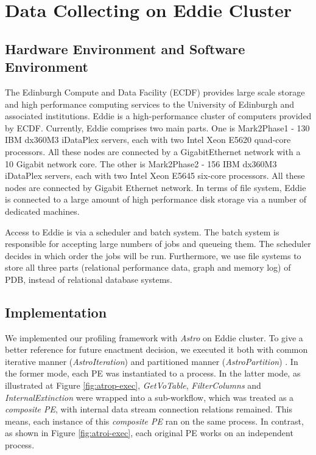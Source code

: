 \documentclass[10pt,twoside,openright,logo]{report}
\begin{document}
\section{Data Collecting on Eddie Cluster}
\subsection{Hardware Environment and Software Environment}
The Edinburgh Compute and Data Facility (ECDF) provides large scale storage and high performance computing services to the University of Edinburgh and associated institutions. Eddie is a high-performance cluster of computers provided by ECDF. Currently, Eddie comprises two main parts. One is Mark2Phase1 - 130 IBM dx360M3 iDataPlex servers, each with two Intel Xeon E5620 quad-core processors. All these nodes are connected by a GigabitEthernet network with a 10 Gigabit network core. The other is Mark2Phase2 - 156 IBM dx360M3 iDataPlex servers, each with two Intel Xeon E5645 six-core processors. All these nodes are connected by Gigabit Ethernet network. In terms of file system, Eddie is connected to a large amount of high performance disk storage via a number of dedicated machines.

Access to Eddie is via a scheduler and batch system. The batch system is responsible for accepting large numbers of jobs and queueing them. The scheduler decides in which order the jobs will be run. Furthermore, we use file systems to store all three parts (relational performance data, graph and memory log) of PDB, instead of relational database systems.

\subsection{Implementation}
\figastropx
\figastroix
We implemented our profiling framework with \textit{Astro} on Eddie cluster. To give a better reference for future enactment decision, we executed it both with common iterative manner (\textit{AstroIteration}) and partitioned manner (\textit{AstroPartition}) . In the former mode, each PE was instantiated to a process. In the latter mode, as illustrated at Figure \ref{fig:atrop-exec}, \textit{GetVoTable}, \textit{FilterColumns} and \textit{InternalExtinction} were wrapped into a sub-workflow, which was treated as a \textit{composite PE}, with internal data stream connection relations remained. This means, each instance of this \textit{composite PE} ran on the same process. In contrast, as shown in Figure \ref{fig:atroi-exec}, each original PE works on an independent process.
\end{document}
